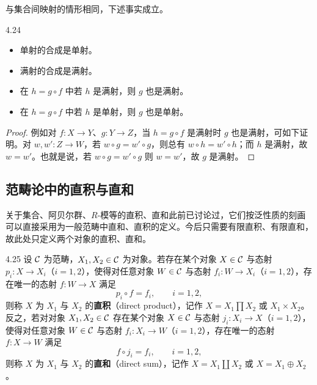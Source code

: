 与集合间映射的情形相同，下述事实成立。

\begin{lemma}{4.24}
\begin{itemize}
  \item 单射的合成是单射。
  \item 满射的合成是满射。
  \item 在 $h=g\circ f$ 中若 $h$ 是满射，则 $g$ 也是满射。
  \item 在 $h=g\circ f$ 中若 $h$ 是单射，则 $g$ 也是单射。
\end{itemize}
\end{lemma}

\begin{proof}
例如对 $f\colon X\to Y$、$g\colon Y\to Z$，当 $h=g\circ f$ 是满射时 $g$ 也是满射，可如下证明。对 $w,w'\colon Z\to W$，若 $w\circ g=w'\circ g$，则总有 $w\circ h=w'\circ h$；而 $h$ 是满射，故 $w=w'$。也就是说，若 $w\circ g=w'\circ g$ 则 $w=w'$，故 $g$ 是满射。
\end{proof}

\subsection{范畴论中的直积与直和}

关于集合、阿贝尔群、$R$-模等的直积、直和此前已讨论过，它们按泛性质的刻画可以直接采用为一般范畴中直和、直积的定义。今后只需要有限直积、有限直和，故此处只定义两个对象的直积、直和。

\begin{definition}{4.25}
设 $\mathcal{C}$ 为范畴，$X_1,X_2\in\mathcal{C}$ 为对象。若存在某个对象 $X\in\mathcal{C}$ 与态射 $p_i\colon X\to X_i$（$i=1,2$），使得对任意对象 $W\in\mathcal{C}$ 与态射 $f_i\colon W\to X_i$（$i=1,2$），存在唯一的态射 $f\colon W\to X$ 满足
\[ p_i\circ f=f_i,\qquad i=1,2, \]
则称 $X$ 为 $X_1$ 与 $X_2$ 的\textbf{直积}（direct product），记作 $X=X_1\prod X_2$ 或 $X_1\times X_2$。反之，若对对象 $X_1,X_2\in\mathcal{C}$ 存在某个对象 $X\in\mathcal{C}$ 与态射 $j_i\colon X_i\to X$（$i=1,2$），使得对任意对象 $W\in\mathcal{C}$ 与态射 $f_i\colon X_i\to W$（$i=1,2$），存在唯一的态射 $f\colon X\to W$ 满足
\[ f\circ j_i=f_i,\qquad i=1,2, \]
则称 $X$ 为 $X_1$ 与 $X_2$ 的\textbf{直和}（direct sum），记作 $X=X_1\coprod X_2$ 或 $X=X_1\oplus X_2$。
\end{definition}

